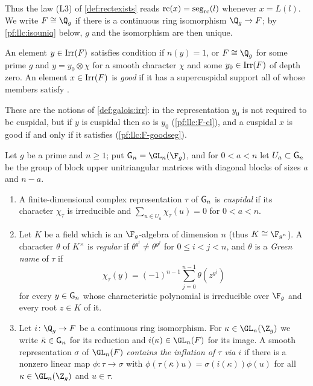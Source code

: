 Thus the law (L3) of \cref{def:rectexists} reads $\mathrm{rc}(x)=\operatorname{seg}_{\mathrm{rc}}(l)$ whenever $x=L(l)$. We write
$F\cong\Q_g$ if there is a continuous ring isomorphism $\Q_g\to F$; by \cref{pf:llc:isouniq} below, $g$ and the
isomorphism are then unique.

\begin{definition}\label{pf:llc:def-good}
An element $y\in\operatorname{Irr}(F)$ satisfies condition \llcGo{} if $n(y)=1$, or $F\cong\Q_g$ for some prime $g$ and
$y=y_0\otimes\chi$ for a smooth character $\chi$ and some $y_0\in\operatorname{Irr}(F)$ of depth zero. An element
$x\in\operatorname{Irr}(F)$ is \emph{good} if it has a supercuspidal support all of whose members satisfy \llcGo{}.
\end{definition}

These are the notions of \cref{def:galois:irr}: in \llcGo{} the representation $y_0$ is not required to be
cuspidal, but if $y$ is cuspidal then so is $y_0$ (\ref{pf:llc:F-cl}), and a cuspidal $x$ is good if and only
if it satisfies \llcGo{} (\ref{pf:llc:F-goodseg}).

\begin{definition}\label{pf:llc:def-green}
Let $g$ be a prime and $n\ge1$; put $\llcG_n=\GL_n(\F_g)$, and for $0<a<n$ let $U_a\subset\mathsf{G}_n$ be the group of
block upper unitriangular matrices with diagonal blocks of sizes $a$ and $n-a$.
\begin{enumerate}[label=(\alph*)]
\item A finite-dimensional complex representation $\tau$ of $\mathsf{G}_n$ is \emph{cuspidal} if its character
  $\chi_\tau$ is irreducible and $\sum_{u\in U_a}\chi_\tau(u)=0$ for $0<a<n$.
\item Let $K$ be a field which is an $\F_g$-algebra of dimension $n$ (thus $K\cong\F_{g^n}$). A character
  $\theta$ of $K^\times$ is \emph{regular} if $\theta^{g^i}\ne\theta^{g^j}$ for $0\le i<j<n$, and $\theta$ is a
  \emph{Green name} of $\tau$ if
  \begin{equation}\label{pf:llc:eq-green}
    \chi_\tau(y)=(-1)^{n-1}\sum_{j=0}^{n-1}\theta(z^{g^j})
  \end{equation}
  for every $y\in\mathsf{G}_n$ whose characteristic polynomial is irreducible over $\F_g$ and every root $z\in K$ of it.
\item Let $i\colon\Q_g\to F$ be a continuous ring isomorphism. For $\kappa\in\GL_n(\Z_g)$ we write
  $\bar\kappa\in\mathsf{G}_n$ for its reduction and $i(\kappa)\in\GL_n(F)$ for its image. A smooth representation
  $\sigma$ of $\GL_n(F)$ \emph{contains the inflation of $\tau$ via $i$} if there is a nonzero linear map
  $\phi\colon\tau\to\sigma$ with $\phi(\tau(\bar\kappa)u)=\sigma(i(\kappa))\phi(u)$ for all $\kappa\in\GL_n(\Z_g)$ and
  $u\in\tau$.
\end{enumerate}
\end{definition}

